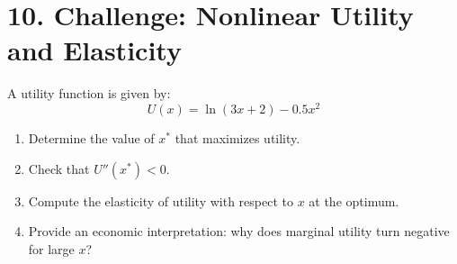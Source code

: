 \documentclass[12pt]{article}
\begin{document}
\section*{10. Challenge: Nonlinear Utility and Elasticity}

A utility function is given by:
\[
U(x) = \ln(3x + 2) - 0.5x^2
\]

\begin{enumerate}
\item Determine the value of \(x^*\) that maximizes utility.
\item Check that \(U''(x^*) < 0\).
\item Compute the elasticity of utility with respect to \(x\) at the optimum.
\item Provide an economic interpretation: why does marginal utility turn negative for large \(x\)?
\end{enumerate}
\end{document}
